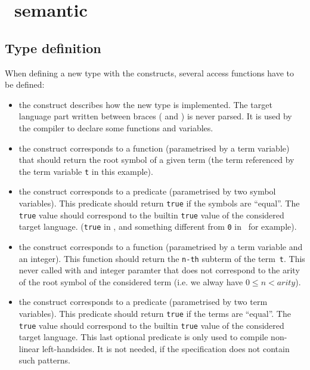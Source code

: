 \section{\TOM\ semantic}

\subsection{Type definition}\label{typedef}

\noindent
When defining a new type with the  constructs,
several access functions have to be defined:
\begin{itemize}
\item\label{implement} the  construct describes how the new type is 
  implemented. The target language part written between braces
  ( and ) is never parsed. It is used by
  the compiler to declare some functions and variables.

\item\label{getfs} the  construct corresponds to a
  function (parametrised by a term variable) that should return the
  root symbol of a given term (the term referenced by the term
  variable \texttt{t} in this example). 

\item\label{cmpfs} the  construct corresponds to a
  predicate (parametrised by two symbol variables).
  This predicate should return \texttt{true} if the symbols are
  ``equal''. The \texttt{true} value should correspond to the 
  builtin \texttt{true} value of the considered target language.
  (\texttt{true} in \Java, and something different from \texttt{0} in
  \Clang\ for example). 

\item\label{getsub} the  construct corresponds to a
  function (parametrised by a term variable and an integer).
  This function should return the \texttt{n-th} subterm of the
  term~\texttt{t}. This never called with and integer paramter that
  does not correspond to the arity of the root symbol of the
  considered term (i.e. we alway have $0 \leq n < arity$).

\item\label{equals} the  construct corresponds to a
  predicate (parametrised by two term variables).
  This predicate should return \texttt{true} if the terms are
  ``equal''. The \texttt{true} value should correspond to the 
  builtin \texttt{true} value of the considered target language.
  This last optional predicate is only used to compile non-linear 
  left-handsides. It is not needed, if the specification does not
  contain such patterns.
\end{itemize}


